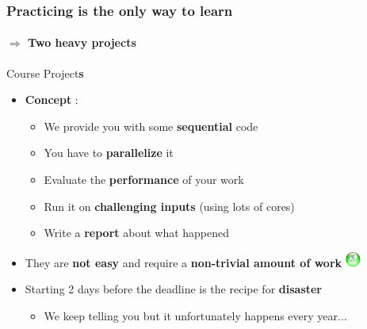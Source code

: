 \documentclass[10pt]{beamer}
\begin{document}
\begin{frame}
  \frametitle{\textbf{Practicing} is the only way to learn}
  \framesubtitle{$\Rightarrow$ Two heavy projects }
  \begin{block}{Course Project\textbf{s}}
    \begin{itemize}
      
    \item \textbf{Concept} :
      \begin{itemize}
      \item We provide you with some \textbf{sequential} code
      \item You have to \textbf{parallelize} it
      \item Evaluate the \textbf{performance} of your work
      \item Run it on \textbf{challenging inputs} (using lots of cores)
      \item Write a \textbf{report} about what happened
      \end{itemize}
  
      \medskip

    \item They are \textbf{not easy} and require a \textbf{non-trivial amount of work} \includegraphics[width=0.5cm,trim=0 17mm 0 0]{triste}
      
      \medskip
      
    \item Starting 2 days before the deadline is the recipe for \textbf{disaster}
      \begin{itemize}
      \item We keep telling you but it unfortunately happens every year...
      \end{itemize}
    \end{itemize}
  \end{block} 
\end{frame}


\end{document}
